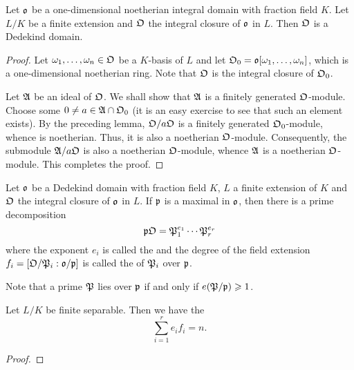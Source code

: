 \begin{theorem}
    Let $\mathfrak{o}$ be a one-dimensional noetherian integral domain with fraction field $K$. Let $L/K$ be a finite extension and $\mathfrak{O}$ the integral closure of $\mathfrak{o}$ in $L$. Then $\mathfrak{O}$ is a Dedekind domain.
\end{theorem}
\begin{proof}
    Let $\omega_1,\dots,\omega_n\in\mathfrak{O}$ be a $K$-basis of $L$ and let $\mathfrak{O}_0 = \mathfrak{o}[\omega_1,\dots,\omega_n]$, which is a one-dimensional noetherian ring. Note that $\mathfrak{O}$ is the integral closure of $\mathfrak{O}_0$.

    Let $\mathfrak{A}$ be an ideal of $\mathfrak{O}$. We shall show that $\mathfrak{A}$ is a finitely generated $\mathfrak{O}$-module. Choose some $0\ne a\in\mathfrak{A}\cap\mathfrak{O}_0$ (it is an easy exercise to see that such an element exists). By the preceding lemma, $\mathfrak{O}/a\mathfrak{O}$ is a finitely generated $\mathfrak{O}_0$-module, whence is noetherian. Thus, it is also a noetherian $\mathfrak{O}$-module. Consequently, the submodule $\mathfrak{A}/a\mathfrak{O}$ is also a noetherian $\mathfrak{O}$-module, whence $\mathfrak{A}$ is a noetherian $\mathfrak{O}$-module. This completes the proof.
\end{proof}

\begin{definition}
    Let $\mathfrak{o}$ be a Dedekind domain with fraction field $K$, $L$ a finite extension of $K$ and $\mathfrak{O}$ the integral closure of $\mathfrak{o}$ in $L$. If $\mathfrak{p}$ is a maximal in $\mathfrak{o}$, then there is a prime decomposition
    \begin{equation*}
        \mathfrak{p}\mathfrak{O} = \mathfrak{P}_1^{e_1}\cdots\mathfrak{P}_r^{e_r}
    \end{equation*}
    where the exponent $e_i$ is called the  and the degree of the field extension $f_i = \left[\mathfrak{O}/\mathfrak{P}_i : \mathfrak{o}/\mathfrak{p}\right]$ is called the  of $\mathfrak{P}_i$ over $\mathfrak{p}$.
\end{definition}

\begin{remark}
    Note that a prime $\mathfrak{P}$ lies over $\mathfrak{p}$ if and only if $e(\mathfrak{P}/\mathfrak{p})\geqslant 1$.
\end{remark}

\begin{theorem}
    Let $L/K$ be finite separable. Then we have the  
    \begin{equation*}
        \sum_{i = 1}^r e_if_i = n.
    \end{equation*}
\end{theorem}
\begin{proof}
\end{proof}
